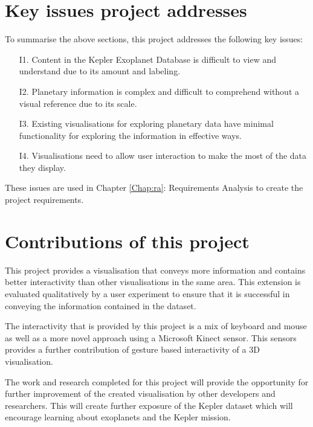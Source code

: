 \section{Key issues project addresses}
To summarise the above sections, this project addresses the following key
issues:
\begin{enumerate}
 \item[I1.] Content in the Kepler Exoplanet Database is difficult to view and
understand due to its amount and labeling.
 \item[I2.] Planetary information is complex and difficult to comprehend without
a visual reference due to its scale.
 \item[I3.] Existing visualisations for exploring planetary data have minimal
functionality for exploring the information in effective ways.
 \item[I4.] Visualisations need to allow user interaction to make the most of
the data they display.
\end{enumerate}

These issues are used in Chapter \ref{Chap:ra}: Requirements Analysis to create the project requirements.

\section{Contributions of this project}
This project provides a visualisation that conveys more information and
contains better interactivity than other visualisations in the same area. This
extension is evaluated qualitatively by a user experiment to ensure that it
is successful in conveying the information contained in the dataset.

The interactivity that is provided by this project is a mix of keyboard and
mouse as well as a more novel approach using a Microsoft Kinect sensor. This
sensors provides a further contribution of gesture based interactivity of a 3D
visualisation.

The work and research completed for this project will provide the opportunity
for further improvement of the created visualisation by other developers and
researchers. This will create further exposure of the Kepler dataset which will
encourage learning about exoplanets and the Kepler mission.
